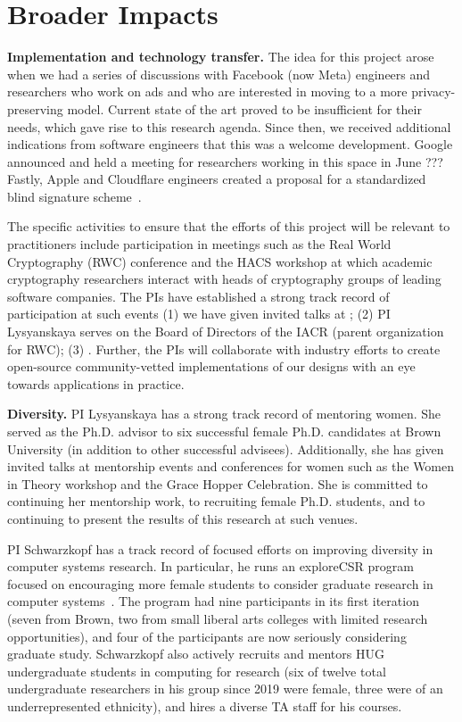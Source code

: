\section{Broader Impacts}
\noindent\textbf{Implementation and technology transfer.}  
The idea for this project arose when we had a series of discussions with Facebook (now Meta) engineers and researchers who work on ads and who are interested in moving to a more privacy-preserving model.  Current state of the art proved to be insufficient for their needs, which gave rise to this research agenda.
%
Since then, we received additional indications from software engineers that this was a welcome development.  Google announced  and held a meeting for researchers working in this space in June ???  Fastly, Apple and Cloudflare engineers created a proposal for a standardized blind signature scheme~\cite{}.  


The specific activities to ensure that the efforts of this project will be relevant to practitioners include participation in meetings such as the Real World Cryptography (RWC) conference and the HACS workshop at which academic cryptography researchers interact with heads of cryptography groups of leading software companies.  The PIs have established a strong track record of participation at such events (1) we have given invited talks at ; (2) PI Lysyanskaya serves on the Board of Directors of the IACR (parent organization for RWC); (3) .
Further, the PIs will collaborate with industry efforts to create open-source community-vetted implementations of our designs with an eye towards applications in practice.  

\noindent\textbf{Diversity.} PI Lysyanskaya has a strong track record of mentoring women.  She served as the Ph.D. advisor to six successful female Ph.D. candidates at Brown University (in addition to other successful advisees).  Additionally, she has given invited talks at mentorship events and conferences for women such as the Women in Theory workshop and the Grace Hopper Celebration.  She is committed to continuing her mentorship work, to recruiting female Ph.D. students, and to continuing to present the results of this research at such venues.

PI Schwarzkopf has a track record of focused efforts on improving diversity in computer systems research. In particular, he runs an exploreCSR program focused on encouraging more female students to consider graduate research in computer systems~\cite{explorecsr-systems}. The program had nine participants in its first iteration (seven from Brown, two from small liberal arts colleges with limited research opportunities), and four of the participants are now seriously considering graduate study. Schwarzkopf also actively recruits and mentors HUG undergraduate students in computing for research (six of twelve total undergraduate researchers in his group since 2019 were female, three were of an underrepresented ethnicity), and hires a diverse TA staff for his courses.


